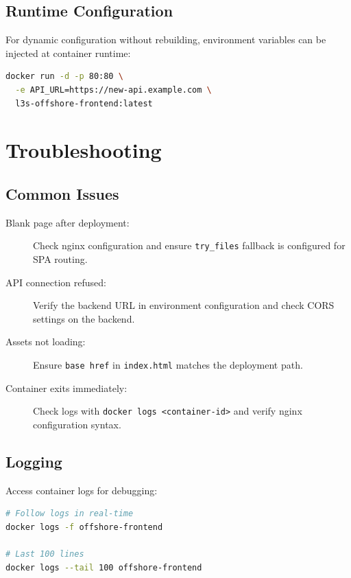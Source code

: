 \subsection{Runtime Configuration}

For dynamic configuration without rebuilding, environment variables can be injected at container runtime:

\begin{lstlisting}[language=bash, caption={Runtime environment injection}]
docker run -d -p 80:80 \
  -e API_URL=https://new-api.example.com \
  l3s-offshore-frontend:latest
\end{lstlisting}

\section{Troubleshooting}
\label{sec:troubleshooting}

\subsection{Common Issues}

\begin{description}
    \item[Blank page after deployment:] Check nginx configuration and ensure \texttt{try\_files} fallback is configured for SPA routing.
    
    \item[API connection refused:] Verify the backend URL in environment configuration and check CORS settings on the backend.
    
    \item[Assets not loading:] Ensure \texttt{base href} in \texttt{index.html} matches the deployment path.
    
    \item[Container exits immediately:] Check logs with \texttt{docker logs <container-id>} and verify nginx configuration syntax.
\end{description}

\subsection{Logging}

Access container logs for debugging:

\begin{lstlisting}[language=bash, caption={Viewing container logs}]
# Follow logs in real-time
docker logs -f offshore-frontend

# Last 100 lines
docker logs --tail 100 offshore-frontend
\end{lstlisting}
